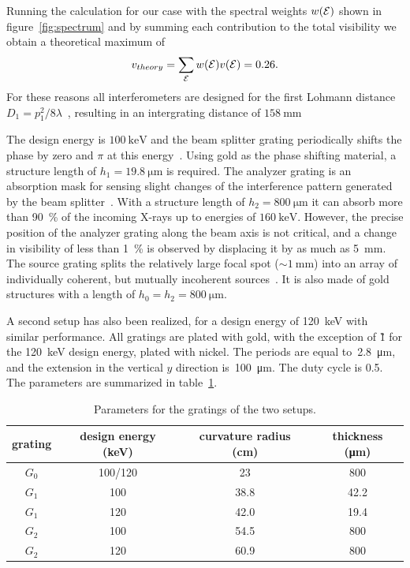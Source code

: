 Running the calculation for our case with the spectral weights $w(\mathcal{E})$ shown in
figure~\ref{fig:spectrum} and by summing each contribution to the total
visibility we obtain a theoretical maximum of
\begin{equation}
    v_{theory} = \sum_{\mathcal{E}} w(\mathcal{E})v(\mathcal{E}) = 0.26.
    \label{eq:maximum.visibility}
\end{equation}
For these reasons all interferometers are designed for the first Lohmann
distance $D_1 = p_1^2 / 8 \lambda$~\cite{Weitkamp2005}, resulting in an
intergrating distance of $\SI{158}{\milli\metre}$

The design energy is $\SI{100}{\kilo\electronvolt}$ and the beam splitter
grating periodically shifts the phase by zero and $\pi$ at this
energy~\cite{David2002}. Using
gold as the phase shifting material, a structure length of
$h_1 = \SI{19.8}{\micro \metre}$ is required. The analyzer grating is an absorption mask
for sensing slight changes of the interference pattern generated by the beam
splitter~\cite{Momose2003a}. With a structure length of $h_2 =
\SI{800}{\micro \metre}$
it can absorb more than \SI{90}{\percent} of the incoming X-rays up to energies of 
$\SI{160}{\kilo\electronvolt}$. However,
the precise position of the analyzer grating along the beam axis is not
critical, and a change in visibility of less than \SI{1}{\percent} is
observed by displacing it by as much as \SI{5}{\milli\metre}. The
source grating splits the relatively large focal spot ($\sim
\SI{1}{\milli\metre}$) into an array of individually coherent, but mutually
incoherent sources~\cite{Pfeiffer2006}. It is also made of gold structures
with a length of $h_0 = h_2 = \SI{800}{\micro \metre}$.

A second setup has also been realized, for a design energy of
\SI{120}{\kilo\eV} with similar performance. All gratings are plated with
gold, with the exception of \G1 for the \SI{120}{\kilo\eV}
design energy, plated with nickel. The periods are equal
to~\SI{2.8}{\micro\metre}, and the extension in
the vertical $y$ direction is~\SI{100}{\micro\metre}. The 
duty cycle is 0.5. The parameters are summarized in
table~\ref{tab:gratings}.

\begin{table}[htb]
    \centering
    \begin{tabular}{*4c}
        \toprule
        grating & design energy (\si{\kilo\eV}) & curvature radius
        (\si{\centi\metre}) & thickness (\si{\micro\metre}) \\
        \midrule
        $G_0$ & \num{100}/\num{120} & \num{23} & \num{800} \\
        $G_1$ & \num{100} & \num{38.8} & \num{42.2} \\
        $G_1$ & \num{120} & \num{42.0} & \num{19.4} \\
        $G_2$ & \num{100} & \num{54.5} & \num{800} \\
        $G_2$ & \num{120} & \num{60.9} & \num{800} \\
        \bottomrule
    \end{tabular}
    \caption{Parameters for the gratings of the two setups.}
    \label{tab:gratings}
\end{table}

